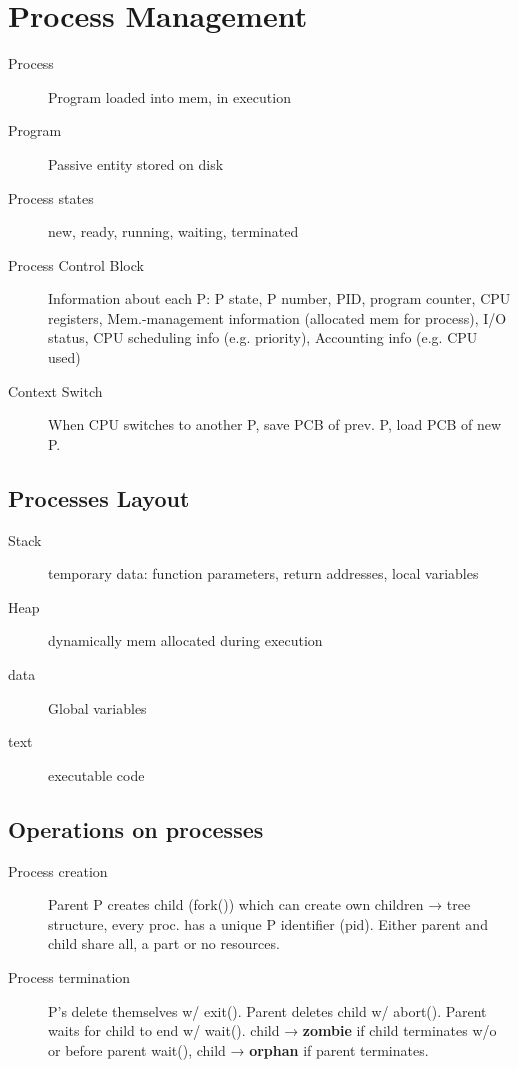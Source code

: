 \section*{Process Management}
\begin{description}
  \item[Process] Program loaded into mem, in execution
  \item[Program] Passive entity stored on disk
  \item[Process states] new, ready, running, waiting, terminated
  \item[Process Control Block] Information about each P: P state, P number, PID, program counter, CPU registers, Mem.-management information (allocated mem for process), I/O status, CPU scheduling info (e.g. priority), Accounting info (e.g. CPU used)
  \item[Context Switch] When CPU switches to another P, save PCB of prev. P, load PCB of new P.
\end{description}
\subsection*{Processes Layout}
\begin{description}
  \item[Stack] temporary data: function parameters, return addresses, local variables
  \item[Heap] dynamically mem allocated during execution
  \item[data] Global variables
  \item[text] executable code
\end{description}
\subsection*{Operations on processes}
\begin{description}
  \item[Process creation]Parent P creates child (fork()) which can create own children → tree structure, every proc. has a unique P identifier (pid). Either parent and child share all, a part or no resources.
  \item[Process termination] P's delete themselves w/ exit(). Parent deletes child w/ abort(). Parent waits for child to end w/ wait(). child → \textbf{zombie} if child terminates w/o or before parent wait(), child → \textbf{orphan} if parent terminates.
\end{description}
